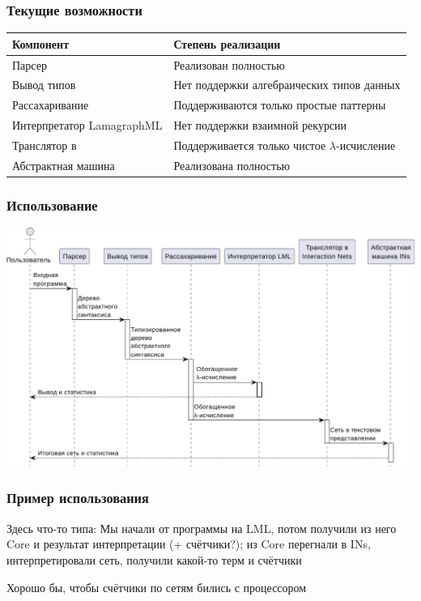 \documentclass
  [ russian
  , aspectratio=169 %
  ] {beamer}
\begin{document}
\begin{frame}
    \frametitle{Текущие возможности}

    \begin{center}
        \begin{tabular}{ll}
            \toprule
            Компонент                 & Степень реализации                                \\
            \midrule
            Парсер                    & Реализован полностью                              \\
            Вывод типов               & Нет поддержки алгебраических типов данных         \\
            Рассахаривание            & Поддерживаются только простые паттерны            \\
            Интерпретатор LamagraphML & Нет поддержки взаимной рекурсии                   \\
            Транслятор в \INs{}       & Поддерживается только чистое $\lambda$-исчисление \\
            Абстрактная машина        & Реализована полностью                             \\
            \bottomrule
        \end{tabular}
    \end{center}

\end{frame}

\begin{frame}
    \frametitle{Использование}

    \begin{center}
        \includegraphics[width=0.8\linewidth]{figures/using.pdf}
    \end{center}

\end{frame}

\begin{frame}
    \frametitle{Пример использования}

    Здесь что-то типа: Мы начали от программы на LML, потом получили из него Core и результат интерпретации (+ счётчики?); из Core перегнали в INs, интерпретировали сеть, получили какой-то терм и счётчики

    Хорошо бы, чтобы счётчики по сетям бились с процессором

\end{frame}
\end{document}
